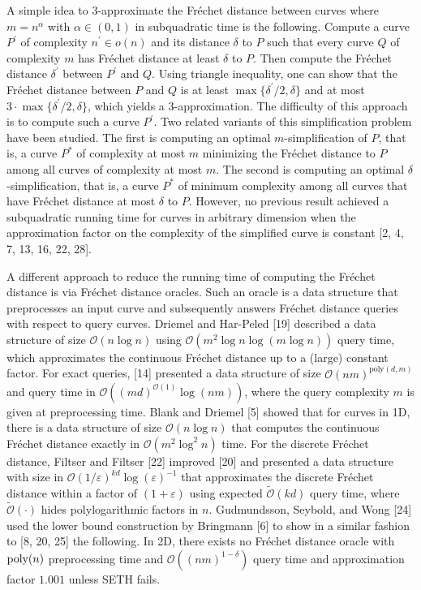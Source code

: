 \par
\par
A simple idea to $3$-approximate the Fréchet distance between curves where $m=n^{\alpha}$ with $\alpha\in(0,1)$ in subquadratic time is the following. Compute a curve $P^{\prime}$ of complexity $n^{\prime}\in o(n)$ and its distance $\delta$ to $P$ such that every curve $Q$ of complexity $m$ has Fréchet distance at least $\delta$ to $P$. Then compute the Fréchet distance $\delta^{\prime}$ between $P^{\prime}$ and $Q$. Using triangle inequality, one can show that the Fréchet distance between $P$ and $Q$ is at least $\max\{\delta^{\prime}/2,\delta\}$ and at most $3\cdot\max\{\delta^{\prime}/2,\delta\}$, which yields a $3$-approximation. The difficulty of this approach is to compute such a curve $P^{\prime}$. Two related variants of this simplification problem have been studied. The first is computing an optimal $m$-simplification of $P$, that is, a curve $P^{*}$ of complexity at most $m$ minimizing the Fréchet distance to $P$ among all curves of complexity at most $m$. The second is computing an optimal $\delta$-simplification, that is, a curve $P^{*}$ of minimum complexity among all curves that have Fréchet distance at most $\delta$ to $P$. However, no previous result achieved a subquadratic running time for curves in arbitrary dimension when the approximation factor on the complexity of the simplified curve is constant [2, 4, 7, 13, 16, 22, 28].
\par
\par
A different approach to reduce the running time of computing the Fréchet distance is via Fréchet distance oracles. Such an oracle is a data structure that preprocesses an input curve and subsequently answers Fréchet distance queries with respect to query curves. Driemel and Har-Peled [19] described a data structure of size $\mathcal{O}(n\log n)$ using $\mathcal{O}(m^{2}\log n\log(m\log n))$ query time, which approximates the continuous Fréchet distance up to a (large) constant factor. For exact queries, [14] presented a data structure of size $\mathcal{O}(nm)^{\text{poly}(d,m)}$ and query time in $\mathcal{O}((md)^{\mathcal{O}(1)}\log(nm))$, where the query complexity $m$ is given at preprocessing time. Blank and Driemel [5] showed that for curves in 1D, there is a data structure of size $\mathcal{O}(n\log n)$ that computes the continuous Fréchet distance exactly in $\mathcal{O}(m^{2}\log^{2}n)$ time. For the discrete Fréchet distance, Filtser and Filtser [22] improved [20] and presented a data structure with size in $\mathcal{O}(1/\varepsilon)^{kd}\log(\varepsilon)^{-1}$ that approximates the discrete Fréchet distance within a factor of $(1+\varepsilon)$ using expected $\widetilde{\mathcal{O}}(kd)$ query time, where $\widetilde{\mathcal{O}}(\cdot)$ hides polylogarithmic factors in $n$. Gudmundsson, Seybold, and Wong [24] used the lower bound construction by Bringmann [6] to show in a similar fashion to [8, 20, 25] the following. In 2D, there exists no Fréchet distance oracle with $\textup{poly}(n)$ preprocessing time and $\mathcal{O}((nm)^{1-\delta})$ query time and approximation factor $1.001$ unless SETH fails.
